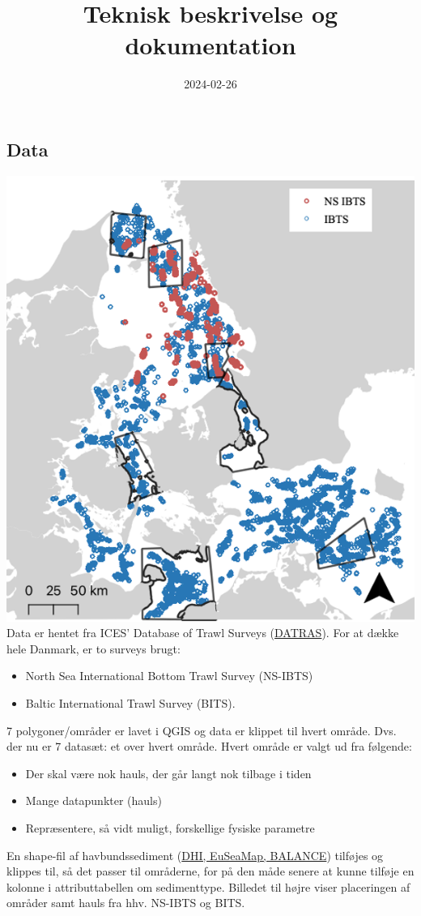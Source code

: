 \documentclass[
]{article}
\title{Teknisk beskrivelse og dokumentation}
\author{}
\date{\vspace{-2.5em}2024-02-26}
\providecommand{\tightlist}{%
  \setlength{\itemsep}{0pt}\setlength{\parskip}{0pt}}
\begin{document}
\maketitle

\hypertarget{data}{%
\subsection{Data}\label{data}}

\includegraphics[width=0.3\linewidth,style="float:right; padding:10px"]{omraader}
Data er hentet fra ICES' Database of Trawl Surveys
(\href{https://www.ices.dk/data/data-portals/Pages/DATRAS.aspx}{DATRAS}).
For at dække hele Danmark, er to surveys brugt:

\begin{itemize}
\tightlist
\item
  North Sea International Bottom Trawl Survey (NS-IBTS)
\item
  Baltic International Trawl Survey (BITS).
\end{itemize}

7 polygoner/områder er lavet i QGIS og data er klippet til hvert område.
Dvs. der nu er 7 datasæt: et over hvert område. Hvert område er valgt ud
fra følgende:

\begin{itemize}
\tightlist
\item
  Der skal være nok hauls, der går langt nok tilbage i tiden
\item
  Mange datapunkter (hauls)
\item
  Repræsentere, så vidt muligt, forskellige fysiske parametre
\end{itemize}

En shape-fil af havbundssediment
(\href{https://metadata.helcom.fi/geonetwork/srv/eng/catalog.search\#/metadata/ab71bbf8-eacc-4a93-9504-46210da8fe6d}{DHI,
EuSeaMap, BALANCE}) tilføjes og klippes til, så det passer til
områderne, for på den måde senere at kunne tilføje en kolonne i
attributtabellen om sedimenttype. Billedet til højre viser placeringen
af områder samt hauls fra hhv. NS-IBTS og BITS.
\end{document}
